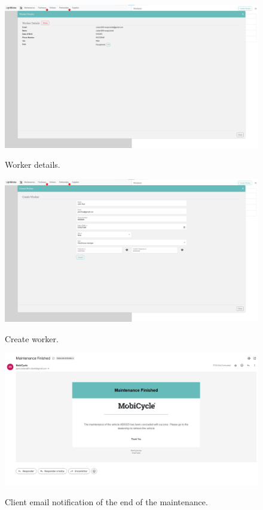 \begin{figure}[htbp]
  \caption{Worker details.}
  \centering
  \includegraphics[width=\textwidth]{figs/Implementation/workshopmanager/workerDetails}
  \label{fig:workerDetails}
\end{figure}



\begin{figure}[htbp]
  \caption{Create worker.}
  \centering
  \includegraphics[width=\textwidth]{figs/Implementation/workshopmanager/workerCreate}
  \label{fig:workerCreate}
\end{figure}


\begin{figure}[htbp]
  \caption{Client email notification of the end of the maintenance.}
  \centering
  \includegraphics[width=\textwidth]{figs/Implementation/client/MaintenanceFinishedNotification}
  \label{fig:MaintenanceFinishedNotification}
\end{figure}


